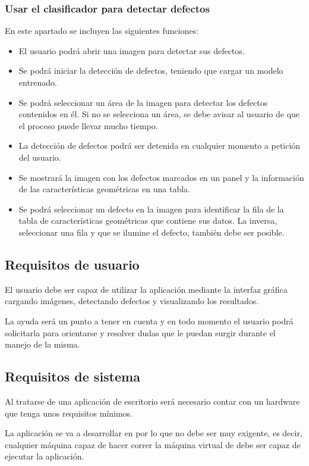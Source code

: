 \subsubsection{Usar el clasificador para detectar defectos}
En este apartado se incluyen las siguientes funciones:
\begin{itemize}
 \item El usuario podrá abrir una imagen para detectar sus defectos.
 \item Se podrá iniciar la detección de defectos, teniendo que cargar un modelo entrenado.
 \item Se podrá seleccionar un área de la imagen para detectar los defectos contenidos en él. Si no se selecciona un área, se debe avisar al usuario de que el proceso puede llevar mucho tiempo.
 \item La detección de defectos podrá ser detenida en cualquier momento a petición del usuario.
 \item Se mostrará la imagen con los defectos marcados en un panel y la información de las características geométricas en una tabla.
 \item Se podrá seleccionar un defecto en la imagen para identificar la fila de la tabla de características geométricas que contiene sus datos. La inversa, seleccionar una fila y que se ilumine el defecto, también debe ser posible.
\end{itemize}

\subsection{Requisitos de usuario}
El usuario debe ser capaz de utilizar la aplicación mediante la interfaz gráfica cargando imágenes, detectando defectos y visualizando los resultados.

La ayuda será un punto a tener en cuenta y en todo momento el usuario podrá solicitarla para orientarse y resolver dudas que le puedan surgir durante el manejo de la misma.


\subsection{Requisitos de sistema}
Al tratarse de una aplicación de escritorio será necesario contar con un hardware que tenga unos requisitos mínimos.

La aplicación se va a desarrollar en \java{} por lo que no debe ser muy exigente, es decir, cualquier máquina capaz de hacer correr la máquina virtual de \java{} debe ser capaz de ejecutar la aplicación.

